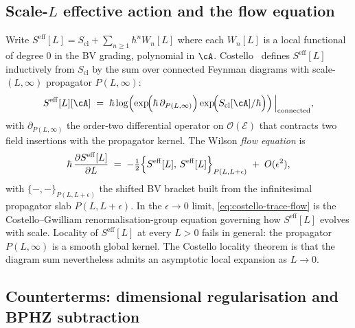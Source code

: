 \subsection{Scale-$L$ effective action and the flow equation}
\label{subsec:costello-trace-flow-equation}

Write $S^{\mathrm{eff}}[L] = S_{\mathrm{cl}} + \sum_{n\geq 1}\hbar^n
W_n[L]$ where each $W_n[L]$ is a local functional of degree $0$ in the
BV grading, polynomial in $\cA$.
Costello~\cite[Definition 2.5.1]{Cos11} defines $S^{\mathrm{eff}}[L]$
inductively from $S_{\mathrm{cl}}$ by the sum over connected Feynman
diagrams with scale-$(L,\infty)$ propagator $P(L,\infty)$:
\begin{equation}\label{eq:costello-trace-feynman-sum}
 S^{\mathrm{eff}}[L][\cA]
 \;=\;
 \hbar\log\!\left(
 \exp\!\Bigl(\hbar\,\partial_{P(L,\infty)}\Bigr)
 \exp\!\Bigl(S_{\mathrm{cl}}[\cA]/\hbar\Bigr)
 \right)\Big|_{\text{connected}},
\end{equation}
with $\partial_{P(L,\infty)}$ the order-two differential operator on
$\mathcal{O}(\mathcal{E})$ that contracts two field insertions with
the propagator kernel. The Wilson \emph{flow equation} is
\cite[Theorem 2.5.3]{Cos11}
\begin{equation}\label{eq:costello-trace-flow}
 \hbar\,\frac{\partial S^{\mathrm{eff}}[L]}{\partial L}
 \;=\;
 -\tfrac{1}{2}\Bigl\{S^{\mathrm{eff}}[L],\,S^{\mathrm{eff}}[L]\Bigr\}
 _{P(L,L+\epsilon)}
 \;+\;O(\epsilon^2),
\end{equation}
with $\{-,-\}_{P(L,L+\epsilon)}$ the shifted BV bracket built from the
infinitesimal propagator slab $P(L,L+\epsilon)$. In the
$\epsilon\to 0$ limit, \eqref{eq:costello-trace-flow} is the
Costello--Gwilliam renormalisation-group equation
governing how $S^{\mathrm{eff}}[L]$ evolves with scale. Locality of
$S^{\mathrm{eff}}[L]$ at every $L>0$ fails in general: the propagator
$P(L,\infty)$ is a smooth global kernel. The Costello locality theorem
\cite[Theorem 3.5.1]{Cos11} is that the diagram sum nevertheless admits
an asymptotic local expansion as $L\to 0$.

\subsection{Counterterms: dimensional regularisation and BPHZ
subtraction}
\label{subsec:costello-trace-counterterms}

